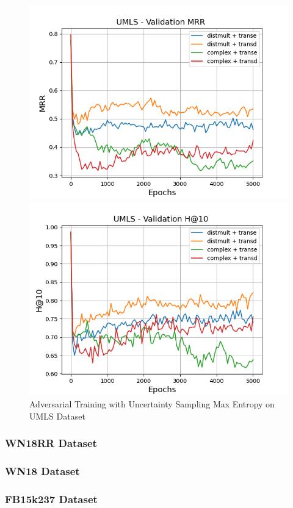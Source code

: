 \begin{figure}
\begin{minipage}{.5\textwidth}
    \end{minipage}
    \begin{minipage}{.5\textwidth}
      \centering
      \includegraphics[width=0.9\linewidth]{figures/results/gan_train/pretrained/uncertainty/max/entropy/umls/gan_train_uncertainty_umls_mrrs.png}
    \end{minipage}%
    \begin{minipage}{.5\textwidth}
      \centering
      \includegraphics[width=0.9\linewidth]{figures/results/gan_train/pretrained/uncertainty/max/entropy/umls/gan_train_uncertainty_umls_hit10s.png}
    \end{minipage}%
    \caption{Adversarial Training with Uncertainty Sampling Max Entropy on \textsc{UMLS} Dataset}
    \label{fig:test}
\end{figure}

\subsubsection{WN18RR Dataset}

\subsubsection{WN18 Dataset}

\subsubsection{FB15k237 Dataset}
